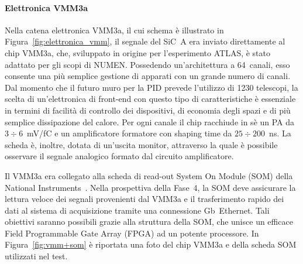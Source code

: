 

\paragraph{Elettronica VMM3a} 
%
Nella catena elettronica VMM3a, il cui schema è illustrato in Figura~\ref{fig:elettronica_vmm}, il segnale del SiC~A era inviato direttamente al chip VMM3a, che, sviluppato in origine per l'esperimento ATLAS, è stato adattato per gli scopi di NUMEN.
Possedendo un'architettura a 64~canali, esso consente una più semplice gestione di apparati con un grande numero di canali.
%
%
Dal momento che il futuro muro per la PID prevede l'utilizzo di 1230 telescopi, la scelta di un'elettronica di front-end con questo tipo di caratteristiche è essenziale in termini di facilità di controllo dei dispositivi, di economia degli spazi e di più semplice dissipazione del calore.
Per ogni canale il chip racchiude in sè un PA da $3 \div 6$~mV/fC e un amplificatore formatore con shaping time da $25 \div 200$~ns.
La scheda è, inoltre, dotata di un'uscita monitor, attraverso la quale è possibile osservare il segnale analogico formato dal circuito amplificatore.

Il VMM3a era collegato alla scheda di read-out System On Module (SOM) della National Instruments~\cite{national_instruments}.
Nella prospettiva della Fase~4, la SOM deve assicurare la lettura veloce dei segnali provenienti dal VMM3a e il trasferimento rapido dei dati al sistema di acquisizione tramite una connessione Gb~Ethernet.
Tali obiettivi saranno possibili grazie alla struttura della SOM, che unisce un efficace Field Programmable Gate Array (FPGA) ad un potente processore.
In Figura~\ref{fig:vmm+som} è riportata una foto del chip VMM3a e della scheda SOM utilizzati nel test.


